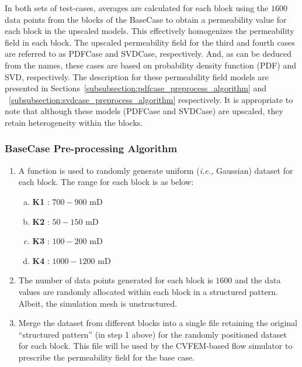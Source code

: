 \documentclass[preprint,12pt]{elsarticle}
\newcommand{\ie}{{\it i.e., }}
\begin{document}
In both sets of test-cases, averages are calculated for each block using the $1600$ data points from the blocks of the BaseCase to obtain a permeability value for each block in the upscaled models. This effectively homogenizes the permeability field in each block. The upscaled permeability field for the third and fourth cases are referred to as PDFCase and SVDCase, respectively. And, as can be deduced from the names, these cases are based on probability density function (PDF) and SVD, respectively. The description for these permeability field models are presented in Sections~\ref{subsubsection:pdfcase_preprocess_algorithm} and ~\ref{subsubsection:svdcase_preprocess_algorithm} respectively. It is appropriate to note that although these models (PDFCase and SVDCase) are upscaled, they retain heterogeneity within the blocks.

\subsubsection{BaseCase Pre-processing Algorithm}\label{subsubsection:basecase_preprocess_algorithm}
\begin{enumerate}[1.]
  \item A function is used to randomly generate uniform (\ie Gaussian) dataset for each block. The range for each block is as below:
  \begin{enumerate}[a)]
    \item \textbf{K1} : $700 - 900$ mD
    \item \textbf{K2} : $50 - 150$ mD
    \item \textbf{K3} : $100 - 200$ mD
    \item \textbf{K4} : $1000 - 1200$ mD
  \end{enumerate}                                                    
  \item The number of data points generated for each block is $1600$ and the data values are randomly allocated within each block in a structured pattern. Albeit, the simulation mesh is unstructured.
  \item Merge the dataset from different blocks into a single file retaining the original ``structured pattern'' (in step 1 above) for the randomly positioned dataset for each block. This file will be used by the CVFEM-based flow simulator to prescribe the permeability field for the base case.
\end{enumerate}
\end{document}
